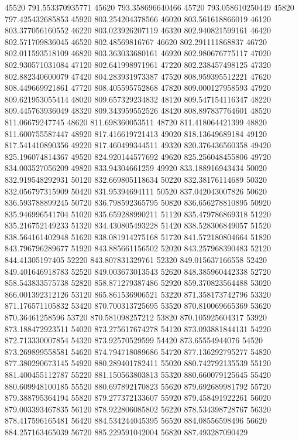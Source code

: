 {45520 791.553370935771
45620 793.358696640466
45720 793.058610250449
45820 797.425432685853
45920 803.254204378566
46020 803.561618866019
46120 803.377056160552
46220 803.023926207119
46320 802.940821599161
46420 802.571709836045
46520 802.48569816767
46620 802.291111868837
46720 802.011593518109
46820 803.363033680161
46920 802.980676775117
47020 802.930571031084
47120 802.641998971961
47220 802.238457498125
47320 802.882340600079
47420 804.283931973387
47520 808.959395512221
47620 808.449669921861
47720 808.405595752868
47820 809.000127958593
47920 809.621953055414
48020 809.657329234832
48120 809.547154116347
48220 809.445763936049
48320 809.343959552526
48420 808.897837764601
48520 811.06679247745
48620 811.698360053511
48720 811.418064421399
48820 811.600755587447
48920 817.416619721413
49020 818.13649689184
49120 817.541410890356
49220 817.460499344511
49320 820.376436560358
49420 825.196074814367
49520 824.920144577692
49620 825.256048455806
49720 834.003527056209
49820 833.94304661259
49920 833.188916943434
50020 832.919548292931
50120 832.669805118634
50220 832.38176114689
50320 832.056797315909
50420 831.95394694111
50520 837.042043007826
50620 836.593788899245
50720 836.798592365795
50820 836.656278810895
50920 835.946996541704
51020 835.659288990211
51120 835.479786869318
51220 835.216752149233
51320 834.430805493228
51420 838.528306849057
51520 838.564161402948
51620 838.081914275168
51720 841.572180804664
51820 843.796796289677
51920 843.885661156502
52020 843.257968390483
52120 844.41305197405
52220 843.807831329761
52320 849.015637166558
52420 849.401646918783
52520 849.003673013543
52620 848.385960442338
52720 858.543833575738
52820 858.871279387486
52920 859.370823564488
53020 866.001392312126
53120 865.861536906521
53220 871.358173742796
53320 871.176571105832
53420 870.700313725695
53520 870.810069665369
53620 870.36461258596
53720 870.581098257212
53820 870.105925604317
53920 873.188472923511
54020 873.275617674278
54120 873.093881844131
54220 872.713330007854
54320 873.92570529599
54420 873.65554944076
54520 873.269899558581
54620 874.794718089686
54720 877.136292795277
54820 877.380290673145
54920 880.289401782411
55020 880.742792135539
55120 881.400455112787
55220 881.150563803813
55320 880.660079125645
55420 880.609948100185
55520 880.697892170823
55620 879.692689981792
55720 879.388795364194
55820 879.277372133607
55920 879.458491922261
56020 879.003393467835
56120 878.922806085802
56220 878.534398728767
56320 878.417596165481
56420 884.534244045395
56520 884.08556598496
56620 884.257163465039
56720 885.229591042004
56820 887.493287090429
}
